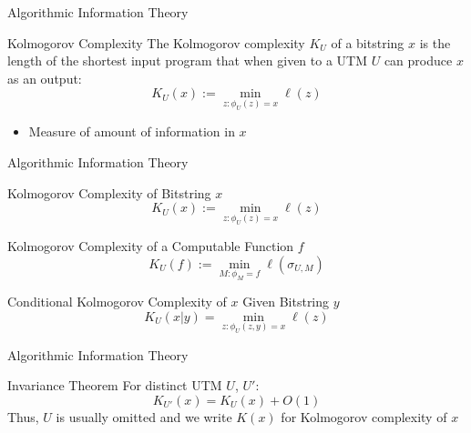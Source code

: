 \documentclass{beamer}
\begin{document}
\begin{frame}{Algorithmic Information Theory}
\begin{block}{Kolmogorov Complexity}
The Kolmogorov complexity $K_U$ of a bitstring $x$ is the length of the shortest input program that when given to a UTM $U$ can produce $x$ as an output:
\begin{equation*}
    K_U(x) :=\min_{z:\phi_U(z) = x}\ell(z)
\end{equation*}
\begin{itemize}
    \item Measure of amount of information in $x$
\end{itemize}
\end{block}
\end{frame}

\begin{frame}{Algorithmic Information Theory}
    \begin{block}{Kolmogorov Complexity of Bitstring $x$}
    \begin{equation*}
        K_U(x) :=\min_{z:\phi_U(z) = x}\ell(z)
    \end{equation*}
    \end{block}
    \begin{block}{Kolmogorov Complexity of a Computable Function $f$}
    \begin{equation*}
        K_U(f) := \min_{M:\phi_M = f} \ell(\sigma_{U,M})
    \end{equation*}
    \end{block}
    \begin{block}{Conditional Kolmogorov Complexity of $x$ Given Bitstring $y$}
\begin{equation*}
    K_U(x|y) = \min_{z:\phi_U(z,y) = x} \ell(z)
\end{equation*}
\end{block}
\end{frame}

\begin{frame}{Algorithmic Information Theory}
    \begin{block}{Invariance Theorem}
    For distinct UTM $U$, $U'$:
        \begin{equation*}
            K_{U'}(x) = K_U(x) + O(1)
        \end{equation*}
        Thus, $U$ is usually omitted and we write $K(x)$ for Kolmogorov complexity of $x$
    \end{block}
\end{frame}
\end{document}
